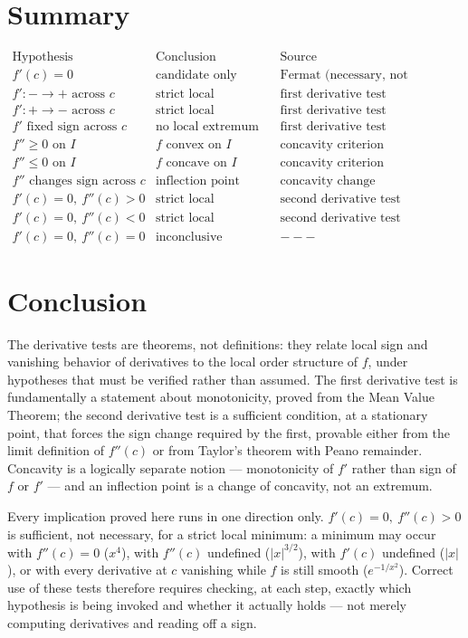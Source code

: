 \documentclass{essay}
\begin{document}
\section{Summary}

\[
  \begin{array}{c|c|c}
    \text{Hypothesis} & \text{Conclusion} & \text{Source}\\
    \hline
    f'(c)=0 & \text{candidate only} & \text{Fermat (necessary, not sufficient)}\\[4pt]
    f':-\to+ \text{ across } c & \text{strict local minimum} & \text{first derivative test}\\[4pt]
    f':+\to- \text{ across } c & \text{strict local maximum} & \text{first derivative test}\\[4pt]
    f' \text{ fixed sign across } c & \text{no local extremum} & \text{first derivative test}\\[4pt]
    f''\geq0 \text{ on } I & f \text{ convex on } I & \text{concavity criterion}\\[4pt]
    f''\leq0 \text{ on } I & f \text{ concave on } I & \text{concavity criterion}\\[4pt]
    f'' \text{ changes sign across } c & \text{inflection point} & \text{concavity change}\\[4pt]
    f'(c)=0,\ f''(c)>0 & \text{strict local minimum} & \text{second derivative test}\\[4pt]
    f'(c)=0,\ f''(c)<0 & \text{strict local maximum} & \text{second derivative test}\\[4pt]
    f'(c)=0,\ f''(c)=0 & \text{inconclusive} & ---
  \end{array}
\]

\section{Conclusion}

The derivative tests are theorems, not definitions: they relate local sign
and vanishing behavior of derivatives to the local order structure of
\(f\), under hypotheses that must be verified rather than assumed. The
first derivative test is fundamentally a statement about monotonicity,
proved from the Mean Value Theorem; the second derivative test is a
sufficient condition, at a stationary point, that forces the sign change
required by the first, provable either from the limit definition of
\(f''(c)\) or from Taylor's theorem with Peano remainder. Concavity is a
logically separate notion --- monotonicity of \(f'\) rather than sign of
\(f\) or \(f'\) --- and an inflection point is a change of concavity, not
an extremum.

Every implication proved here runs in one direction only. \(f'(c)=0,\
f''(c)>0\) is sufficient, not necessary, for a strict local minimum: a
minimum may occur with \(f''(c)=0\) (\(x^{4}\)), with \(f''(c)\) undefined
(\(|x|^{3/2}\)), with \(f'(c)\) undefined (\(|x|\)), or with every
derivative at \(c\) vanishing while \(f\) is still smooth
(\(e^{-1/x^{2}}\)). Correct use of these tests therefore requires checking,
at each step, exactly which hypothesis is being invoked and whether it
actually holds --- not merely computing derivatives and reading off a sign.
\end{document}
